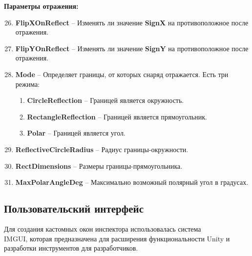\textbf{Параметры отражения:}
\begin{enumerate}
    \setcounter{enumi}{25}
    \item {\small \textbf{FlipXOnReflect}} -- Изменять ли значение {\small \textbf{SignX}} на противоположное после отражения.
    \item {\small \textbf{FlipYOnReflect}} -- Изменять ли значение {\small \textbf{SignY}} на противоположное после отражения.
    \item {\small \textbf{Mode}} -- Определяет границы, от которых снаряд отражается. Есть три режима:
    \begin{enumerate}[label=\textbullet]
        \item {\small \textbf{CircleReflection}} -- Границей является окружность.
        \item {\small \textbf{RectangleReflection}} -- Границей является прямоугольник.
        \item {\small \textbf{Polar}} -- Границей является угол.
    \end{enumerate}
    \item {\small \textbf{ReflectiveCircleRadius}} -- Радиус границы-окружности.
    \item {\small \textbf{RectDimensions}} -- Размеры границы-прямоугольника.
    \item {\small \textbf{MaxPolarAngleDeg}} -- Максимально возможный полярный угол в градусах.
\end{enumerate}



\pagebreak


\subsection{Пользовательский интерфейс}

Для создания кастомных окон инспектора использовалась система\\ IMGUI\cite{s10}, которая предназначена для расширения функциональности Unity и разработки инструментов для разработчиков.

